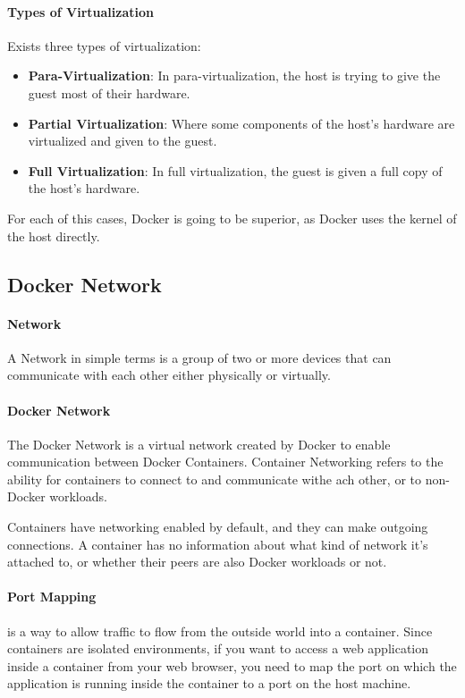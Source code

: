 \documentclass[a4paper]{article}
\begin{document}
    \paragraph{Types of Virtualization} Exists three types of virtualization:
    \begin{itemize}
        \item \textbf{Para-Virtualization}: In para-virtualization, the host is trying to give the guest most of their hardware. 
        \item \textbf{Partial Virtualization}: Where some components of the host's hardware are virtualized and given to the guest.
        \item \textbf{Full Virtualization}: In full virtualization, the guest is given a full copy of the host's hardware.
    \end{itemize}

    For each of this cases, Docker is going to be superior, as Docker uses the kernel of the host directly.

    \subsection{Docker Network}

    \paragraph{Network} A Network in simple terms is a group of two or more devices that can communicate with each other either physically or virtually.

    \paragraph*{Docker Network} The Docker Network  is a virtual network created by Docker to enable communication between Docker Containers. Container Networking refers to the ability for containers to connect to and communicate withe ach other, or to non-Docker workloads.

    Containers have networking enabled by default, and they can make outgoing connections. A container has no information about what kind of network it's attached to, or whether their peers are also Docker workloads or not. 

    \paragraph*{Port Mapping} is a way to allow traffic to flow from the outside world into a container. Since containers are isolated environments, if you want to access a web application inside a container from your web browser, you need to map the port on which the application is running inside the container to a port on the host machine.
\end{document}
